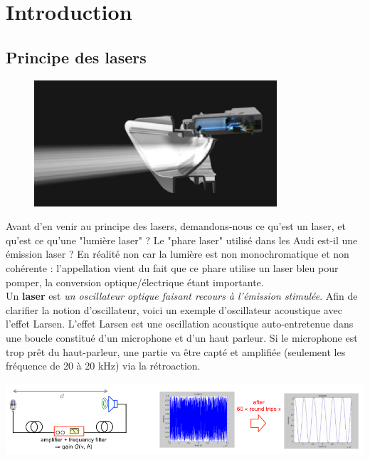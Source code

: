 \chapter{Introduction}
	\section{Principe des lasers}
	\begin{figure}
	\vspace{-5mm}
	\includegraphics[scale=0.5]{ch1/image1.png}
	\end{figure}
	Avant d'en venir au principe des lasers, demandons-nous ce qu'est un laser, et qu'est ce qu'une "lumière
	laser" ? Le "phare laser" utilisé dans les Audi est-il une émission laser ? En réalité non car la lumière 
	est non monochromatique et non cohérente : l'appellation vient du fait que ce phare utilise un laser bleu 
	pour pomper, la conversion optique/électrique étant importante.\\
	
	Un \textbf{laser} est \textit{un oscillateur optique faisant recours à l'émission stimulée}. Afin de clarifier 
	la notion d'oscillateur, voici un exemple d'oscillateur acoustique avec l'effet Larsen. L'effet Larsen 
	est une oscillation acoustique auto-entretenue dans une boucle constitué d'un microphone et d'un haut 
	parleur. Si le microphone est trop prêt du haut-parleur, une partie va être capté et amplifiée (seulement les
	fréquence de 20 à 20 kHz) via la rétroaction. 

	\begin{center}
			\includegraphics[scale=0.5]{ch1/image2.png}
		\end{center}	
	
